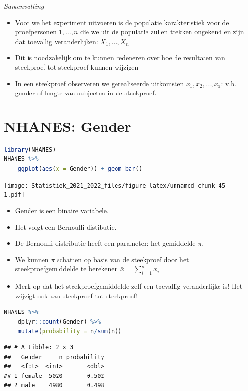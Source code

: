 \documentclass[
  12pt,dutch,coursenotes]{book}
\providecommand{\tightlist}{%
  \setlength{\itemsep}{0pt}\setlength{\parskip}{0pt}}
\theoremstyle{definition}
\theoremstyle{definition}
\theoremstyle{definition}
\theoremstyle{definition}
\theoremstyle{remark}
\begin{document}
\emph{Samenvatting}

\begin{itemize}
\item
  Voor we het experiment uitvoeren is de populatie karakteristiek voor de proefpersonen \(1,\ldots,n\) die we uit de populatie zullen trekken ongekend en zijn dat toevallig veranderlijken: \(X_1, \ldots, X_n\)
\item
  Dit is noodzakelijk om te kunnen redeneren over hoe de resultaten van steekproef tot steekproef kunnen wijzigen
\item
  In een steekproef observeren we gerealiseerde uitkomsten \(x_1, x_2, \dots, x_n\): v.b. gender of lengte van subjecten in de steekproef.
\end{itemize}

\hypertarget{nhanes-gender}{%
\section{NHANES: Gender}\label{nhanes-gender}}

\begin{lstlisting}[language=R]
library(NHANES)
NHANES %>%
    ggplot(aes(x = Gender)) + geom_bar()
\end{lstlisting}

\texttt{[image: Statistiek\_2021\_2022\_files/figure-latex/unnamed-chunk-45-1.pdf]}

\begin{itemize}
\tightlist
\item
  Gender is een binaire variabele.
\item
  Het volgt een Bernoulli distibutie.
\item
  De Bernoulli distributie heeft een parameter: het gemiddelde \(\pi\).
\item
  We kunnen \(\pi\) schatten op basis van de steekproef door het steekproefgemiddelde te berekenen \(\bar x = \sum\limits_{i=1}^n x_i\)
\item
  Merk op dat het steekproefgemiddelde zelf een toevallig veranderlijke is! Het wijzigt ook van steekproef tot steekproef!
\end{itemize}

\begin{lstlisting}[language=R]
NHANES %>%
    dplyr::count(Gender) %>%
    mutate(probability = n/sum(n))
\end{lstlisting}

\begin{lstlisting}
## # A tibble: 2 x 3
##   Gender     n probability
##   <fct>  <int>       <dbl>
## 1 female  5020       0.502
## 2 male    4980       0.498
\end{lstlisting}
\end{document}
